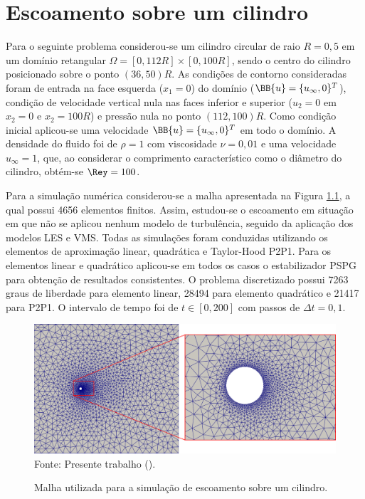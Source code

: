 \chapter[APÊNDICE \ref{Ap:cylinder}]{Escoamento sobre um cilindro}
\label{Ap:cylinder}

Para o seguinte problema considerou-se um cilindro circular de raio $R=0,5$ em um domínio retangular $\Omega=[0,112R]\times[0,100R]$, sendo o centro do cilindro posicionado sobre o ponto $(36,50)R$. As condições de contorno consideradas foram de entrada na face esquerda ($x_1=0$) do domínio ($\BB{u}=\{u_\infty,0\}^T$), condição de velocidade vertical nula nas faces inferior e superior ($u_2=0$ em $x_2=0$ e $x_2=100R$) e pressão nula no ponto $(112,100)R$. Como condição inicial aplicou-se uma velocidade $\BB{u}=\{u_\infty,0\}^T$ em todo o domínio. A densidade do fluido foi de $\rho=1$ com viscosidade $\nu=0,01$ e uma velocidade $u_\infty=1$, que, ao considerar o comprimento característico como o diâmetro do cilindro, obtém-se $\Rey=100$.

Para a simulação numérica considerou-se a malha apresentada na Figura \ref{fig:cyl-mesh}, a qual possui 4656 elementos finitos. Assim, estudou-se o escoamento em situação em que não se aplicou nenhum modelo de turbulência, seguido da aplicação dos modelos LES e VMS. Todas as simulações foram conduzidas utilizando os elementos de aproximação linear, quadrática e Taylor-Hood P2P1. Para os elementos linear e quadrático aplicou-se em todos os casos o estabilizador PSPG para obtenção de resultados consistentes. O problema discretizado possui 7263 graus de liberdade para elemento linear, 28494 para elemento quadrático e 21417 para P2P1. O intervalo de tempo foi de $t\in[0,200]$ com passos de $\Delta t=0,1$.

\begin{figure}[h!]
    \centering
    \caption{Malha utilizada para a simulação de escoamento sobre um cilindro.}
    \includegraphics[width=\linewidth]{Figuras/cylinder/analise2/mesh.png}
    \\Fonte: Presente trabalho (\the\year).
    \label{fig:cyl-mesh}
\end{figure}

